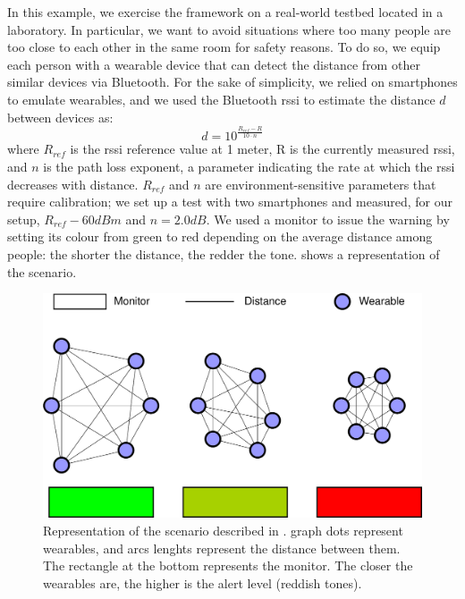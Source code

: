 \documentclass[conference]{IEEEtran}
\providecommand{\decibel}{dB}
\providecommand{\decibelmeter}{dBm}
\providecommand{\qty}[2]{#1#2}
\newcommand{\meta}[1]{{\color{blue}#1}}
\begin{document}
In this example, we exercise the framework on a real-world testbed
located in a laboratory.
%
In particular,
we want to avoid situations where too many people are too close to each other in the same room for safety reasons.
%
To do so,
we equip each person with a wearable device that can detect the distance from other similar devices via Bluetooth.
%
For the sake of simplicity,
we relied on smartphones to emulate wearables,
and we used
%
    the Bluetooth \ac{rssi} to estimate the distance $d$ between devices as:
    $$d=10^{\frac{R_{ref} - R}{10 \cdot n}}$$
    where $R_{ref}$ is the \ac{rssi} reference value at 1 meter,
    R is the currently measured \ac{rssi},
    and $n$ is the path loss exponent,
    a parameter indicating the rate at which the \ac{rssi} decreases with distance.
    $R_{ref}$ and $n$ are environment-sensitive parameters that require calibration;
    we set up a test with two smartphones and measured,
    for our setup,
    $R_{ref}\qty{-60}{\decibelmeter}$ and $n=\qty{2.0}{\decibel}$.
%
We used a monitor to issue the warning
by setting its colour from green to red depending on the average distance among people:
the shorter the distance, the redder the tone.
%
 shows a representation of the scenario.
%
\begin{figure}
    \centering
    \includegraphics[width=.9\columnwidth]{figures/crow-laboratory-demo.drawio.pdf}
    \caption{
        Representation of the scenario described in .
        graph dots represent wearables,
        and arcs lenghts represent the distance between them.
        The rectangle at the bottom represents the monitor.
        The closer the wearables are, the higher is the alert level
        (reddish tones).
    }
    \label{fig:crowd-alert}
\end{figure}
\end{document}
